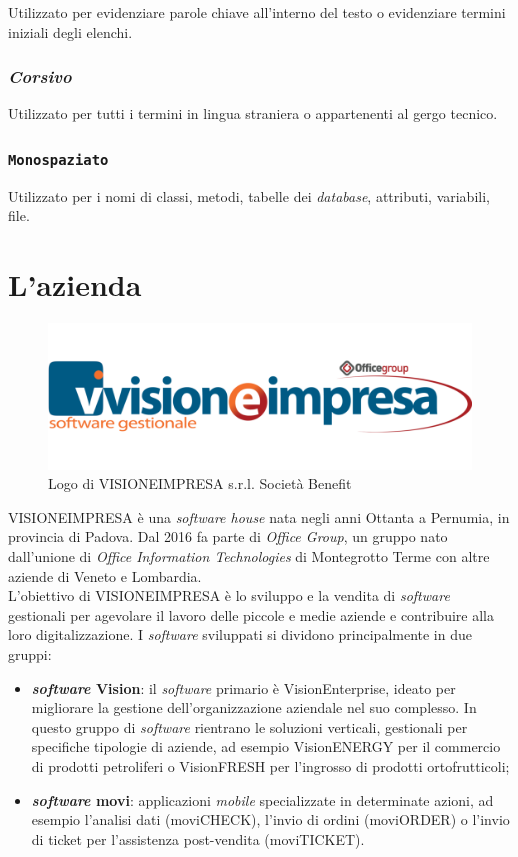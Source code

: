 Utilizzato per evidenziare parole chiave all'interno del testo o evidenziare termini iniziali degli elenchi.

\subsubsection{\textit{Corsivo}}

Utilizzato per tutti i termini in lingua straniera o appartenenti al gergo tecnico.

\subsubsection{\texttt{Monospaziato}}

Utilizzato per i nomi di classi, metodi, tabelle dei \textit{database}, attributi, variabili, file.

\section{L'azienda}

\vspace{-3mm}

\begin{figure}[!h]
    \centering 
    \includegraphics[width=0.6\columnwidth]{images/logo-visioneimpresa.png} 
    \caption{Logo di VISIONEIMPRESA s.r.l. Società Benefit}
\end{figure}

\noindent VISIONEIMPRESA è una \textit{software house} nata negli anni Ottanta a Pernumia, in provincia di Padova. Dal 2016 fa parte di \textit{Office Group}, un gruppo nato dall'unione di \textit{Office Information Technologies} di Montegrotto Terme con altre aziende di Veneto e Lombardia.\\
L'obiettivo di VISIONEIMPRESA è lo sviluppo e la vendita di \textit{software} gestionali per agevolare il lavoro delle piccole e medie aziende e contribuire alla loro digitalizzazione. I \textit{software} sviluppati si dividono principalmente in due gruppi:
\begin{itemize}
    \item \textbf{\textit{software} Vision}: il \textit{software} primario è VisionEnterprise, ideato per migliorare la gestione dell'organizzazione aziendale nel suo complesso. In questo gruppo di \textit{software} rientrano le soluzioni verticali, gestionali per specifiche tipologie di aziende, ad esempio VisionENERGY per il commercio di prodotti petroliferi o VisionFRESH per l'ingrosso di prodotti ortofrutticoli;
    \item \textbf{\textit{software} movi}: applicazioni \textit{mobile} specializzate in determinate azioni, ad esempio l'analisi dati (moviCHECK), l'invio di ordini (moviORDER) o l'invio di ticket per l'assistenza post-vendita (moviTICKET).
\end{itemize}

